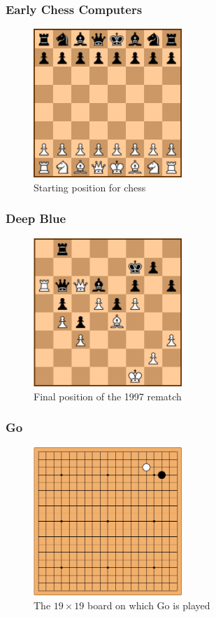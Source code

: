 \documentclass{beamer}
\begin{document}
\begin{frame} %
\frametitle{Early Chess Computers}
\begin{figure}
	\centering
	\includegraphics[width=0.5\textwidth]{images/chessinitial.png}
	\caption{Starting position for chess \cite{chessgames}}
	\label{chessinitial}
\end{figure}
\end{frame}

\begin{frame} %
\frametitle{Deep Blue}
\begin{figure}
	\centering
	\includegraphics[width=0.5\textwidth]{images/deep-blue.png}
	\caption{Final position of the 1997 rematch \cite{chessgames}}
	\label{deep-blue}
\end{figure}
\end{frame}

\begin{frame} %
\frametitle{Go}
\begin{figure}
	\centering
	\includegraphics[width=0.5\textwidth]{images/go.png}
	\caption{The $19\times19$ board on which Go is played}
	\label{go}
\end{figure}
\end{frame}
\end{document}

